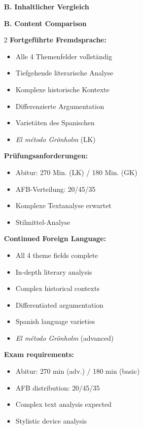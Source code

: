 \documentclass[10pt,a4paper]{article}
\newcommand{\secbil}[2]{%
\vspace{6pt}
\noindent\colorbox{spaet}{\parbox{0.48\textwidth}{\color{white}\bfseries\small #1}}%
\hfill%
\colorbox{english}{\parbox{0.48\textwidth}{\color{white}\bfseries\small #2}}
\vspace{3pt}
}
\begin{document}
\vspace{4mm}

\secbil{B. Inhaltlicher Vergleich}{B. Content Comparison}

\begin{paracol}{2}
\small
\textbf{Fortgeführte Fremdsprache:}
\begin{itemize}[noitemsep,topsep=2pt]
\item Alle 4 Themenfelder vollständig
\item Tiefgehende literarische Analyse
\item Komplexe historische Kontexte
\item Differenzierte Argumentation
\item Varietäten des Spanischen
\item \textit{El método Grönholm} (LK)
\end{itemize}

\textbf{Prüfungsanforderungen:}
\begin{itemize}[noitemsep,topsep=2pt]
\item Abitur: 270 Min. (LK) / 180 Min. (GK)
\item AFB-Verteilung: 20/45/35
\item Komplexe Textanalyse erwartet
\item Stilmittel-Analyse
\end{itemize}

\switchcolumn

\small\color{english}
\textbf{Continued Foreign Language:}
\begin{itemize}[noitemsep,topsep=2pt]
\item All 4 theme fields complete
\item In-depth literary analysis
\item Complex historical contexts
\item Differentiated argumentation
\item Spanish language varieties
\item \textit{El método Grönholm} (advanced)
\end{itemize}

\textbf{Exam requirements:}
\begin{itemize}[noitemsep,topsep=2pt]
\item Abitur: 270 min (adv.) / 180 min (basic)
\item AFB distribution: 20/45/35
\item Complex text analysis expected
\item Stylistic device analysis
\end{itemize}

\end{paracol}
\end{document}

